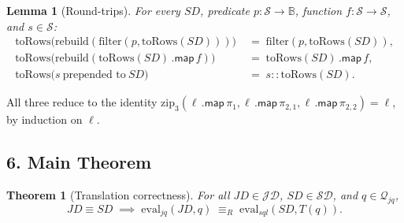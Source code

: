 \documentclass{article}
\newtheorem{theorem}{Theorem}
\newtheorem{lemma}{Lemma}
\begin{document}
\begin{lemma}[Round-trips]
\label{lem:roundtrip}
For every $SD$, predicate $p : \mathcal{S} \to \mathbb{B}$, function $f : \mathcal{S} \to \mathcal{S}$, and $s \in \mathcal{S}$:
\begin{align*}
\mathrm{toRows}\big(\mathrm{rebuild}(\mathrm{filter}(p, \mathrm{toRows}(SD)))\big) &\;=\; \mathrm{filter}(p, \mathrm{toRows}(SD)), \\
\mathrm{toRows}\big(\mathrm{rebuild}(\mathrm{toRows}(SD)\,\textsf{.map}\,f)\big) &\;=\; \mathrm{toRows}(SD)\,\textsf{.map}\,f, \\
\mathrm{toRows}\big(s\ \text{prepended to}\ SD\big) &\;=\; s :: \mathrm{toRows}(SD).
\end{align*}
\end{lemma}
All three reduce to the identity $\mathrm{zip}_3(\ell\,\textsf{.map}\,\pi_1, \ell\,\textsf{.map}\,\pi_{2,1}, \ell\,\textsf{.map}\,\pi_{2,2}) = \ell$, by induction on $\ell$.

\subsection*{6. Main Theorem}

\begin{theorem}[Translation correctness]
\label{thm:main}
For all $JD \in \mathcal{JD}$, $SD \in \mathcal{SD}$, and $q \in \mathcal{Q}_{jq}$,
\[
JD \equiv SD \;\implies\; \mathrm{eval}_{jq}(JD, q) \;\equiv_R\; \mathrm{eval}_{sql}(SD, T(q)).
\]
\end{theorem}
\end{document}

